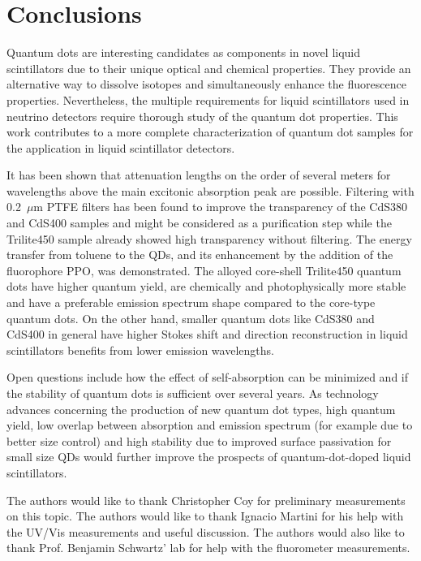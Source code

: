 \documentclass[cits]{JINST}
\begin{document}
\section{Conclusions}

Quantum dots are interesting candidates as components in novel liquid scintillators due to their unique optical and chemical properties. They provide an alternative way to dissolve isotopes and simultaneously enhance the fluorescence properties. Nevertheless, the multiple requirements for liquid scintillators used in neutrino detectors require thorough study of the quantum dot properties. This work contributes to a more complete characterization of quantum dot samples for the application in liquid scintillator detectors. 

It has been shown that attenuation lengths on the order of several meters for wavelengths above the main excitonic absorption peak are possible. Filtering with 0.2~$\mu$m PTFE filters has been found to improve the transparency of the CdS380 and CdS400 samples and might be considered as a purification step while the Trilite450 sample already showed high transparency without filtering. The energy transfer from toluene to the QDs, and its enhancement by the addition of the fluorophore PPO, was demonstrated. The alloyed core-shell Trilite450 quantum dots have higher quantum yield, are chemically and photophysically more stable and have a preferable emission spectrum shape compared to the core-type quantum dots. On the other hand, smaller quantum dots like CdS380 and CdS400 in general have higher Stokes shift and direction reconstruction in liquid scintillators benefits from lower emission wavelengths. 

Open questions include how the effect of self-absorption can be minimized and if the stability of quantum dots is sufficient over several years. As technology advances concerning the production of new quantum dot types, high quantum yield, low overlap between absorption and emission spectrum (for example due to better size control) and high stability due to improved surface passivation for small size QDs would further improve the prospects of quantum-dot-doped liquid scintillators.

\acknowledgments
The authors would like to thank Christopher Coy for preliminary measurements on this topic. The authors would like to thank Ignacio Martini for his help with the UV/Vis measurements and useful discussion. The authors would also like to thank Prof. Benjamin Schwartz' lab for help with the fluorometer measurements.
\end{document}
